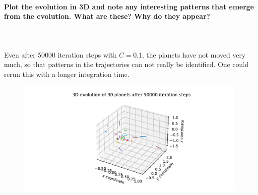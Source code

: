    \paragraph{Plot the evolution in 3D and note any interesting patterns that 
        emerge from the evolution. What are these? Why do they appear?
    } \ \\
        \\
        Even after 50000 iteration steps with $C=0.1$, the planets have not 
        moved very much, so that patterns in the trajectories can not 
        really be identified. One could rerun this with a longer integration 
        time.
        \begin{figure}[h!]
            \centering
            \includegraphics[width=\textwidth]{./figures/task2_30body_3D_new.pdf}
        \end{figure} \ \\ 

    \newpage
